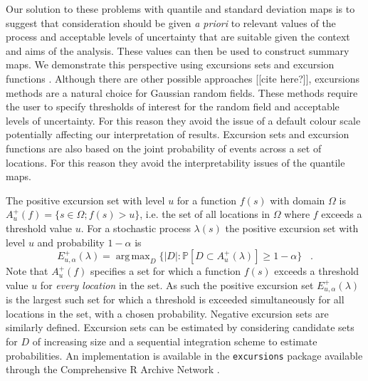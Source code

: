 \documentclass{stylefile16/statsoc}
\DeclareMathOperator*{\argmax}{arg\,max}  %
\begin{document}
Our solution to these problems with quantile and standard deviation maps is to suggest that consideration should be given \emph{a priori} to relevant values of the process and acceptable levels of uncertainty that are suitable given the context and aims of the analysis.  These values can then be used to construct summary maps.  We demonstrate this perspective using excursions sets and excursion functions \citep{bolin_excursion_2015}.  Although there are other possible approaches [[cite here?]], excursions methods are a natural choice for Gaussian random fields.  These methods require the user to specify thresholds of interest for the random field and acceptable levels of uncertainty.  For this reason they avoid the issue of a default colour scale potentially affecting our interpretation of results.  Excursion sets and excursion functions are also based on the joint probability of events across a set of locations.  For this reason they avoid the interpretability issues of the quantile maps.

The positive excursion set with level $u$ for a function $f(s)$ with domain $\Omega$ is $A_u^{+}(f) = \{ s \in \Omega ; f(s) > u \}$, i.e. the set of all locations in $\Omega$ where $f$ exceeds a threshold value $u$. For a stochastic process $\lambda(s)$ the positive excursion set with level $u$ and probability $1 - \alpha$ is
\begin{equation*}
E_{u,\alpha}^{+}(\lambda) = \argmax_{D}\{\lvert D \rvert : \mathbb{P}\left[D \subset A_u^{+}(\lambda)\right] \geq 1 - \alpha \} \;\;\; .
\end{equation*}
Note that $A_u^{+}(f)$ specifies a set for which a function $f(s)$ exceeds a threshold value $u$ for \textit{every location} in the set. As such the positive excursion set $E_{u,\alpha}^{+}(\lambda)$ is the largest such set for which a threshold is exceeded simultaneously for all locations in the set, with a chosen probability.  Negative excursion sets are similarly defined.  Excursion sets can be estimated by considering candidate sets for $D$ of increasing size and a sequential integration scheme to estimate probabilities.  An implementation is available in the \texttt{excursions} package \citep{bolin_calculating_2018} available through the Comprehensive R Archive Network \citep{r_2017}.
\end{document}
